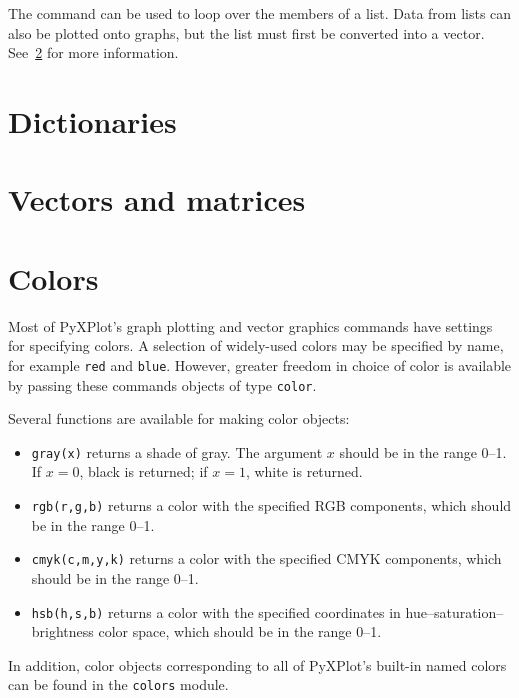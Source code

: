 \vspace{3mm}

\vspace{3mm}

The  command can be used to loop over the members of a list.
Data from lists can also be plotted onto graphs, but the list must first be
converted into a vector. See~\ref{sec:vectors} for more information.

\section{Dictionaries}

\section{Vectors and matrices}
\label{sec:vectors}

\section{Colors}

Most of PyXPlot's graph plotting and vector graphics commands have settings for
specifying colors. A selection of widely-used colors may be specified by name,
for example {\tt red} and {\tt blue}. However, greater freedom in choice of
color is available by passing these commands objects of type {\tt color}.

Several functions are available for making color objects:

\begin{itemize}
\item {\tt gray(x)} returns a shade of gray. The argument $x$ should be in the range 0--1. If $x=0$, black is returned; if $x=1$, white is returned.
\item {\tt rgb(r,g,b)} returns a color with the specified RGB components, which should be in the range 0--1.
\item {\tt cmyk(c,m,y,k)} returns a color with the specified CMYK components, which should be in the range 0--1.
\item {\tt hsb(h,s,b)} returns a color with the specified coordinates in hue--saturation--brightness color space, which should be in the range 0--1.
\end{itemize}

\noindent In addition, color objects corresponding to all of PyXPlot's built-in
named colors can be found in the {\tt colors} module.

